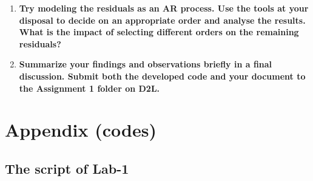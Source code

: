 \documentclass[12pt]{article}
\begin{document}
\begin{enumerate}
\item \textbf{Try modeling the residuals as an AR process. Use the tools at your disposal to decide on an appropriate order and analyse the results. What is the impact of selecting different orders on the remaining residuals?}




\item \textbf{Summarize your findings and observations briefly in a final discussion. Submit both the developed code and your document to the Assignment 1 folder on D2L.}






\end{enumerate}



\newpage




\newpage
\section{Appendix (codes)}
\subsection{The script of Lab-1}
\end{document}
